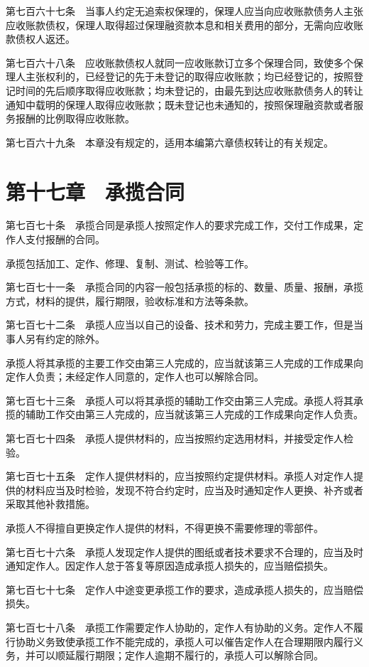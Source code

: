 \documentclass[UTF8,12pt,a4paper]{ctexbook}
\begin{document}
第七百六十七条　当事人约定无追索权保理的，保理人应当向应收账款债务人主张应收账款债权，保理人取得超过保理融资款本息和相关费用的部分，无需向应收账款债权人返还。

第七百六十八条　应收账款债权人就同一应收账款订立多个保理合同，致使多个保理人主张权利的，已经登记的先于未登记的取得应收账款；均已经登记的，按照登记时间的先后顺序取得应收账款；均未登记的，由最先到达应收账款债务人的转让通知中载明的保理人取得应收账款；既未登记也未通知的，按照保理融资款或者服务报酬的比例取得应收账款。

第七百六十九条　本章没有规定的，适用本编第六章债权转让的有关规定。

\section*{第十七章　承揽合同}

第七百七十条　承揽合同是承揽人按照定作人的要求完成工作，交付工作成果，定作人支付报酬的合同。

承揽包括加工、定作、修理、复制、测试、检验等工作。

第七百七十一条　承揽合同的内容一般包括承揽的标的、数量、质量、报酬，承揽方式，材料的提供，履行期限，验收标准和方法等条款。

第七百七十二条　承揽人应当以自己的设备、技术和劳力，完成主要工作，但是当事人另有约定的除外。

承揽人将其承揽的主要工作交由第三人完成的，应当就该第三人完成的工作成果向定作人负责；未经定作人同意的，定作人也可以解除合同。

第七百七十三条　承揽人可以将其承揽的辅助工作交由第三人完成。承揽人将其承揽的辅助工作交由第三人完成的，应当就该第三人完成的工作成果向定作人负责。

第七百七十四条　承揽人提供材料的，应当按照约定选用材料，并接受定作人检验。

第七百七十五条　定作人提供材料的，应当按照约定提供材料。承揽人对定作人提供的材料应当及时检验，发现不符合约定时，应当及时通知定作人更换、补齐或者采取其他补救措施。

承揽人不得擅自更换定作人提供的材料，不得更换不需要修理的零部件。

第七百七十六条　承揽人发现定作人提供的图纸或者技术要求不合理的，应当及时通知定作人。因定作人怠于答复等原因造成承揽人损失的，应当赔偿损失。

第七百七十七条　定作人中途变更承揽工作的要求，造成承揽人损失的，应当赔偿损失。

第七百七十八条　承揽工作需要定作人协助的，定作人有协助的义务。定作人不履行协助义务致使承揽工作不能完成的，承揽人可以催告定作人在合理期限内履行义务，并可以顺延履行期限；定作人逾期不履行的，承揽人可以解除合同。
\end{document}
